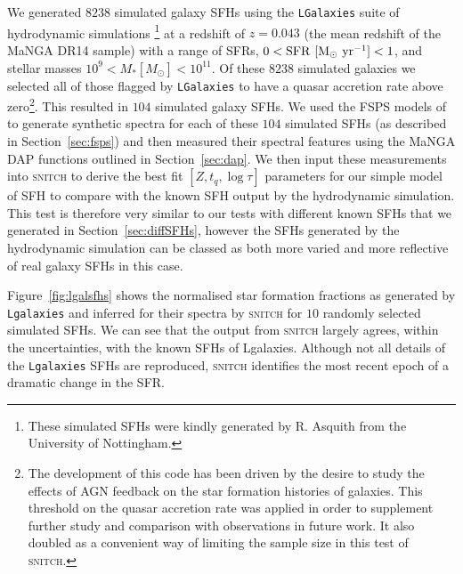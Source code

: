 \documentclass[useAMS,usenatbib]{mn2e}
\begin{document}
We generated $8238$ simulated galaxy SFHs using the \texttt{LGalaxies} suite of hydrodynamic simulations \citep{henriques15}\footnote{These simulated SFHs were kindly generated by R. Asquith from the University of Nottingham.} at a redshift of $z=0.043$ (the mean redshift of the MaNGA DR14 sample) with a range of SFRs, $0 < \rm{SFR}~[M_{\odot}~\rm{yr}^{-1}] < 1$, and stellar masses $10^9 < M_{*} [M_{\odot}] < 10^{11}$. Of these $8238$ simulated galaxies we selected all of those flagged by \texttt{LGalaxies} to have a quasar accretion rate above zero\footnote{The development of this code has been driven by the desire to study the effects of AGN feedback on the star formation histories of galaxies. This threshold on the quasar accretion rate was applied in order to supplement further study and comparison with observations in future work. It also doubled as a convenient way of limiting the sample size in this test of \textsc{snitch}.}. This resulted in $104$ simulated galaxy SFHs. We used the FSPS models of \cite{conroy10} to generate synthetic spectra for each of these $104$ simulated SFHs (as described in Section~\ref{sec:fsps}) and then measured their spectral features using the MaNGA DAP functions outlined in Section~\ref{sec:dap}. We then input these measurements into \textsc{snitch} to derive the best fit $[Z, t_q, \log \tau]$ parameters for our simple model of SFH to compare with the known SFH output by the hydrodynamic simulation. This test is therefore very similar to our tests with different known SFHs that we generated in Section~\ref{sec:diffSFHs}, however the SFHs generated by the hydrodynamic simulation can be classed as both more varied and more reflective of real galaxy SFHs in this case.

Figure~\ref{fig:lgalsfhs} shows the normalised star formation fractions as generated by \texttt{Lgalaxies} and inferred for their spectra by \textsc{snitch} for $10$ randomly selected simulated SFHs. We can see that the output from \textsc{snitch} largely agrees, within the uncertainties, with the known SFHs of Lgalaxies. Although not all details of the \texttt{Lgalaxies} SFHs are reproduced, \textsc{snitch} identifies the most recent epoch of a dramatic change in the SFR.
\end{document}
